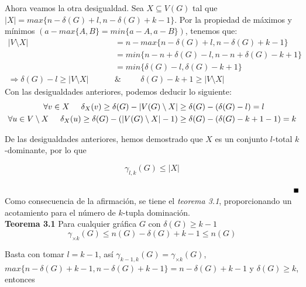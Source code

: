 \documentclass{article}
\begin{document}
Ahora veamos la otra desigualdad. Sea $X\subseteq V(G)$ tal que $|X|= max \{n-\delta(G)+l, n-\delta(G)+k-1\}$. Por la propiedad de máximos y mínimos $(a-max\{A, B\} = min\{a-A, a-B\})$, tenemos que:\\
\begin{align*}
|V\setminus X|&= n-max\{n-\delta(G)+l, n-\delta(G)+k-1\}\\
&= min\{n-n+\delta(G)-l, n-n+\delta(G)-k+1\}\\
&= min\{\delta(G)-l, \delta(G)-k+1\}\\
\Longrightarrow \delta(G)-l \ge |V\setminus X|  \hspace{1cm}  & \& \hspace{1cm} \delta(G)-k+1 \ge |V\setminus X| 
\end{align*}
Con las desigualdades anteriores, podemos deducir lo siguiente:\\
\begin{align*}
\forall v \in X \hspace{.5cm} \delta_{X}(v)\geq \delta(G)-|V(G)\setminus X|&\geq \delta(G)-(\delta(G)-l)=l\\
\forall u \in V\setminus X \hspace{.5cm} \delta_{X}(u)\geq \delta(G)-(|V(G)\setminus X|-1)&\geq \delta(G)-(\delta(G)-k+1-1)=k
\end{align*}

De las desigualdades anteriores, hemos demostrado que $X$ es un conjunto $l$-total $k$-dominante, por lo que

$$\gamma_{l,k}(G)\leq |X|$$


$\hspace{15.5cm}\blacksquare$\\

Como consecuencia de la afirmación, se tiene el \textit{teorema 3.1}, proporcionando un acotamiento para el número de $k$-tupla dominación.\\

\textbf{Teorema 3.1} Para cualquier gráfica $G$ con $\delta(G)\geq k-1$
$$\gamma_{\times k}(G)\leq n(G)- \delta(G)+k-1\leq n(G)$$


Basta con tomar $l=k-1$, así $\gamma_{k-1,k}(G) = \gamma_{\times k}(G)$, $max\{n-\delta(G)+k-1, n-\delta(G)+k-1\} = n-\delta(G)+k-1$ y $\delta(G)\geq k$, entonces
\end{document}

